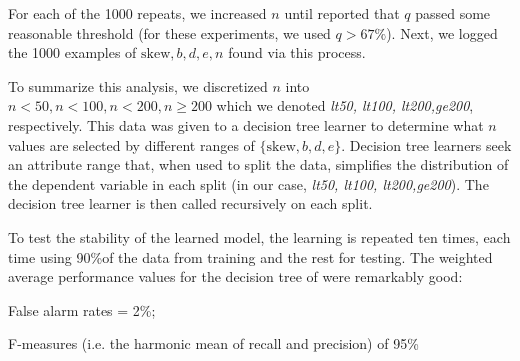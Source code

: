     For each of the 1000 repeats,
     we increased $n$ until  reported that $q$ passed some reasonable threshold (for these experiments, we used $q>67\%$).
     Next, we logged the 1000 examples of   $\textrm{skew},b,d,e,n$ found via this process.
     
    To summarize this analysis, we discretized $n$ into $n<50, n<100, n<200,n\ge200$ which we denoted {\em lt50, lt100, lt200,ge200}, respectively.
    This data was given to a decision tree learner to determine what $n$ values are selected by different
    ranges of $\{\textrm{skew},b,d,e\}$. Decision tree learners seek an attribute range that, when used to split the data,
      simplifies the distribution of the dependent variable in each split (in our case, {\em lt50, lt100, lt200,ge200}).
      The decision tree learner is then called recursively on each split.

      To test the stability of the learned model, the learning is repeated ten times, each time using 90\%of the data from training and the rest
      for testing. The weighted average performance values for the decision tree of  were remarkably good:
      \bi
    \item False alarm rates = 2\%;
    \item F-measures (i.e. the harmonic mean of recall and precision) of 95\%
      \ei

      
      
